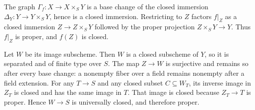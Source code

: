 The graph $\Gamma_f:X\to X\times_SY$ is a base change of the closed immersion $\Delta_Y:Y\to Y\times_SY$, hence is a closed immersion. Restricting to $Z$ factors $f|_Z$ as a closed immersion $Z\to Z\times_SY$ followed by the proper projection $Z\times_SY\to Y$. Thus $f|_Z$ is proper, and $f(Z)$ is closed.

Let $W$ be its image subscheme. Then $W$ is a closed subscheme of $Y$, so it is separated and of finite type over $S$. The map $Z\to W$ is surjective and remains so after every base change: a nonempty fiber over a field remains nonempty after a field extension. For any $T\to S$ and any closed subset $C\subseteq W_T$, its inverse image in $Z_T$ is closed and has the same image in $T$. That image is closed because $Z_T\to T$ is proper. Hence $W\to S$ is universally closed, and therefore proper.
